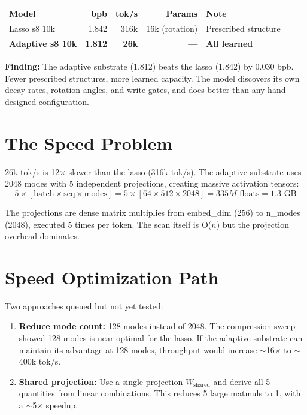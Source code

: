 \documentclass[11pt,a4paper]{report}
\newcommand{\finding}[1]{\textcolor{finding}{\textbf{Finding:}} #1}
\begin{document}
\begin{center}
\begin{tabular}{lrrrl}
\toprule
Model & bpb & tok/s & Params & Note \\
\midrule
Lasso s8 10k & 1.842 & 316k & 16k (rotation) & Prescribed structure \\
\textbf{Adaptive s8 10k} & \textbf{1.812} & \textbf{26k} & \textbf{---} & \textbf{All learned} \\
\bottomrule
\end{tabular}
\end{center}

\finding{The adaptive substrate (1.812) beats the lasso (1.842) by 0.030 bpb.} Fewer prescribed structures, more learned capacity. The model discovers its own decay rates, rotation angles, and write gates, and does better than any hand-designed configuration.

\section{The Speed Problem}

26k tok/s is 12$\times$ slower than the lasso (316k tok/s). The adaptive substrate uses 2048 modes with 5 independent projections, creating massive activation tensors:
\[
5 \times [\text{batch} \times \text{seq} \times \text{modes}] = 5 \times [64 \times 512 \times 2048] = 335M \text{ floats} = 1.3 \text{ GB}
\]

The projections are dense matrix multiplies from embed\_dim (256) to n\_modes (2048), executed 5 times per token. The scan itself is O($n$) but the projection overhead dominates.

\section{Speed Optimization Path}

Two approaches queued but not yet tested:
\begin{enumerate}[nosep]
\item \textbf{Reduce mode count:} 128 modes instead of 2048. The compression sweep showed 128 modes is near-optimal for the lasso. If the adaptive substrate can maintain its advantage at 128 modes, throughput would increase $\sim$16$\times$ to $\sim$400k tok/s.

\item \textbf{Shared projection:} Use a single projection $W_{\text{shared}}$ and derive all 5 quantities from linear combinations. This reduces 5 large matmuls to 1, with a $\sim$5$\times$ speedup.
\end{enumerate}
\end{document}
